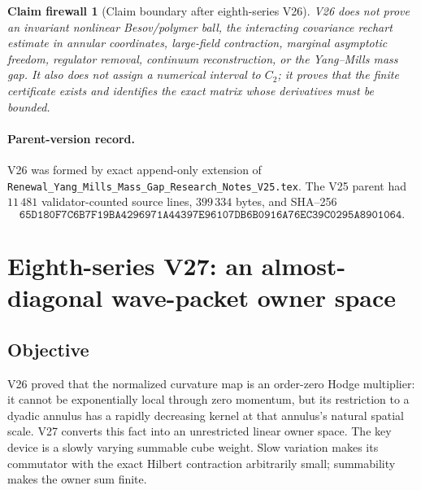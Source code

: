 \documentclass[11pt,oneside]{book}
\newtheorem{firewall}[theorem]{Claim firewall}
\theoremstyle{definition}
\theoremstyle{remark}
\begin{document}
\begin{firewall}[Claim boundary after eighth-series V26]
\label{fire:e8v26-claim}
V26 does not prove an invariant nonlinear Besov/polymer ball, the
interacting covariance rechart estimate in annular coordinates,
large-field contraction, marginal asymptotic freedom, regulator
removal, continuum reconstruction, or the Yang--Mills mass gap.  It
also does not assign a numerical interval to \(C_2\); it proves that
the finite certificate exists and identifies the exact matrix whose
derivatives must be bounded.
\end{firewall}

\paragraph{Parent-version record.}
V26 was formed by exact append-only extension of
\texttt{Renewal\_Yang\_Mills\_Mass\_Gap\_Research\_Notes\_V25.tex}.
The V25 parent had \(11\,481\) validator-counted source lines,
\(399\,334\) bytes, and SHA--256
\[
\texttt{65D180F7C6B7F19BA4296971A44397E96107DB6B0916A76EC39C0295A8901064}.
\]



\section{Eighth-series V27: an almost-diagonal wave-packet owner
space}

\subsection{Objective}

V26 proved that the normalized curvature map is an order-zero Hodge
multiplier: it cannot be exponentially local through zero momentum,
but its restriction to a dyadic annulus has a rapidly decreasing
kernel at that annulus's natural spatial scale.  V27 converts this
fact into an unrestricted linear owner space.  The key device is a
slowly varying summable cube weight.  Slow variation makes its
commutator with the exact Hilbert contraction arbitrarily small;
summability makes the owner sum finite.
\end{document}
